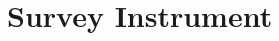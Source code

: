 \documentclass{article}
\begin{document}
% 
% 
% 


% 
% 
% 

% 
% 
% 

% 
% 
% 

% 
% 
% 


\section{Survey Instrument}


\end{document}
